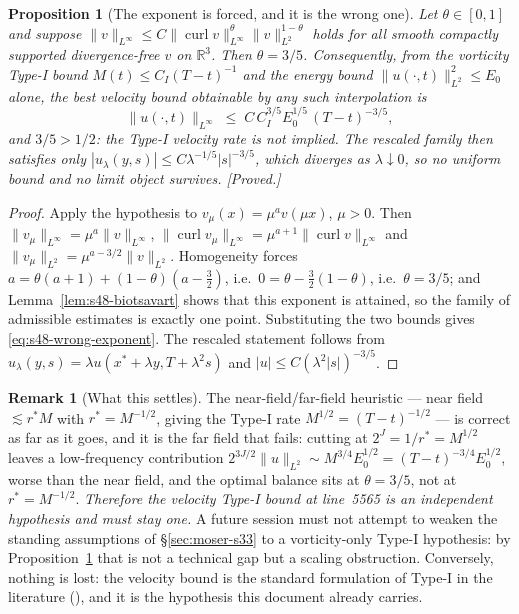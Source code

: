 \documentclass[11pt]{article}
\newtheorem{proposition}[theorem]{Proposition}
\theoremstyle{definition}
\newtheorem{remark}[theorem]{Remark}
\theoremstyle{remark}
\newcommand{\R}{\mathbb{R}}
\newcommand{\curl}{\operatorname{curl}}
\begin{document}
\begin{proposition}[The exponent is forced, and it is the wrong one]
  \label{prop:s48-bridge-fails}
  Let $\theta\in[0,1]$ and suppose
  $\|v\|_{L^\infty}\leq C\|\curl v\|_{L^\infty}^{\theta}\|v\|_{L^2}^{1-\theta}$
  holds for all smooth compactly supported divergence-free $v$ on $\R^3$.
  Then $\theta=3/5$. Consequently, from the vorticity Type-I bound
  $M(t)\leq C_I(T-t)^{-1}$ and the energy bound
  $\|u(\cdot,t)\|_{L^2}^2\leq E_0$ alone, the best velocity bound obtainable
  by \emph{any} such interpolation is
  \begin{equation}\label{eq:s48-wrong-exponent}
    \|u(\cdot,t)\|_{L^\infty}
    \;\leq\; C\,C_I^{3/5}E_0^{1/5}\,(T-t)^{-3/5},
  \end{equation}
  and $3/5>1/2$: the Type-I velocity rate is \emph{not} implied. The rescaled
  family then satisfies only
  $|u_\lambda(y,s)|\leq C\lambda^{-1/5}|s|^{-3/5}$, which diverges as
  $\lambda\downarrow0$, so no uniform bound and no limit object survives.
  \emph{[Proved.]}
\end{proposition}
\begin{proof}
  Apply the hypothesis to $v_\mu(x)=\mu^{a}v(\mu x)$, $\mu>0$. Then
  $\|v_\mu\|_{L^\infty}=\mu^{a}\|v\|_{L^\infty}$,
  $\|\curl v_\mu\|_{L^\infty}=\mu^{a+1}\|\curl v\|_{L^\infty}$ and
  $\|v_\mu\|_{L^2}=\mu^{a-3/2}\|v\|_{L^2}$. Homogeneity forces
  $a=\theta(a+1)+(1-\theta)(a-\tfrac32)$, i.e.\
  $0=\theta-\tfrac32(1-\theta)$, i.e.\ $\theta=3/5$; and
  Lemma~\ref{lem:s48-biotsavart} shows that this exponent is attained, so the
  family of admissible estimates is exactly one point. Substituting the two
  bounds gives \eqref{eq:s48-wrong-exponent}. The rescaled statement follows
  from $u_\lambda(y,s)=\lambda u(x^*+\lambda y,T+\lambda^2s)$ and
  $|u|\leq C(\lambda^2|s|)^{-3/5}$.
\end{proof}

\begin{remark}[What this settles]\label{rem:s48-bridge-consequence}
  The near-field/far-field heuristic --- near field $\lesssim r^*M$ with
  $r^*=M^{-1/2}$, giving the Type-I rate $M^{1/2}=(T-t)^{-1/2}$ --- is correct
  as far as it goes, and it is the far field that fails: cutting at
  $2^J=1/r^*=M^{1/2}$ leaves a low-frequency contribution
  $2^{3J/2}\|u\|_{L^2}\sim M^{3/4}E_0^{1/2}=(T-t)^{-3/4}E_0^{1/2}$, worse than
  the near field, and the optimal balance sits at $\theta=3/5$, not at
  $r^*=M^{-1/2}$. \emph{Therefore the velocity Type-I bound at line~5565 is an
  independent hypothesis and must stay one.} A future session must not attempt
  to weaken the standing assumptions of \S\ref{sec:moser-s33} to a
  vorticity-only Type-I hypothesis: by
  Proposition~\ref{prop:s48-bridge-fails} that is not a technical gap but a
  scaling obstruction. Conversely, nothing is lost: the velocity bound is the
  standard formulation of Type-I in the literature
  (\cite{AlbrittonBarker2019}), and it is the hypothesis this
  document already carries.
\end{remark}
\end{document}
